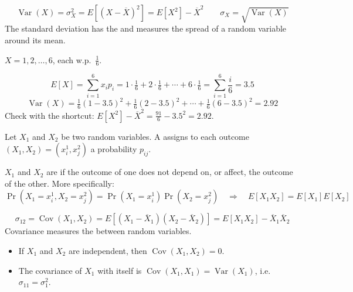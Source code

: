 \begin{definition}
    \[\boxed{\operatorname{Var}(X) = \sigma_X^2 = E\left[(X - \overline{X})^2\right] = E[X^2] - \overline{X}^2}\qquad \boxed{\sigma_X = \sqrt{\operatorname{Var}(X)}}\]
    The standard deviation has the  and measures the spread of a random variable around its mean.
\end{definition}

\begin{example}
    $X = 1, 2, \dots, 6$, each w.p.\ $\frac{1}{6}$.
    \begin{center}
    \end{center}
    \[E[X] = \sum_{i=1}^{6}x_ip_i = 1\cdot\tfrac{1}{6} + 2\cdot\tfrac{1}{6} + \cdots + 6\cdot\tfrac{1}{6} = \sum_{i=1}^{6}\frac{i}{6} = 3.5\]
    \[\operatorname{Var}(X) = \tfrac{1}{6}(1-3.5)^2 + \tfrac{1}{6}(2-3.5)^2 + \cdots + \tfrac{1}{6}(6-3.5)^2 = 2.92\]
    Check with the shortcut: $E[X^2] - \overline{X}^2 = \frac{91}{6} - 3.5^2 = 2.92$.
\end{example}

Let $X_1$ and $X_2$ be two random variables. A  assigns to each outcome $(X_1, X_2) = (x_i^1, x_j^2)$ a probability $p_{ij}$.

$X_1$ and $X_2$ are  if the outcome of one does not depend on, or affect, the outcome of the other. More specifically:
\[\Pr(X_1 = x_i^1, X_2 = x_j^2) = \Pr(X_1 = x_i^1)\Pr(X_2 = x_j^2) \quad \Rightarrow \quad E[X_1X_2] = E[X_1]E[X_2]\]

\begin{definition}[\rb{Covariance}]
    \[\boxed{\sigma_{12} = \operatorname{Cov}(X_1, X_2) = E\left[(X_1 - \overline{X}_1)(X_2 - \overline{X}_2)\right] = E[X_1X_2] - \overline{X}_1\overline{X}_2}\]
    Covariance measures the  between random variables.
    \begin{itemize}
        \item If $X_1$ and $X_2$ are independent, then $\operatorname{Cov}(X_1, X_2) = 0$.
        \item The covariance of $X_1$ with itself is $\operatorname{Cov}(X_1, X_1) = \operatorname{Var}(X_1)$, i.e.\ $\sigma_{11} = \sigma_1^2$.
    \end{itemize}
\end{definition}

